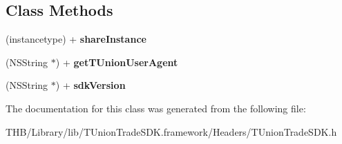 \subsection*{Class Methods}
\begin{DoxyCompactItemize}
\item 
\mbox{\label{interface_t_union_trade_s_d_k_ad99a0b50ff3385d3da32e276a68bebbd}} 
(instancetype) + {\bfseries share\+Instance}
\item 
\mbox{\label{interface_t_union_trade_s_d_k_a8f6b0070ebc05f9787153aa22f40f6ed}} 
(N\+S\+String $\ast$) + {\bfseries get\+T\+Union\+User\+Agent}
\item 
\mbox{\label{interface_t_union_trade_s_d_k_aa0004936728a9b3eb7dd4ef57d05346d}} 
(N\+S\+String $\ast$) + {\bfseries sdk\+Version}
\end{DoxyCompactItemize}


The documentation for this class was generated from the following file\+:\begin{DoxyCompactItemize}
\item 
T\+H\+B/\+Library/lib/\+T\+Union\+Trade\+S\+D\+K.\+framework/\+Headers/T\+Union\+Trade\+S\+D\+K.\+h\end{DoxyCompactItemize}
